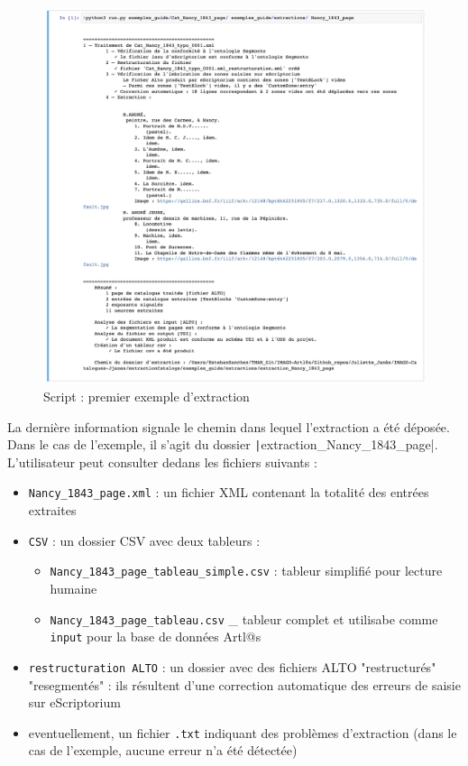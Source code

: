 \documentclass[a4paper,12pt,twoside]{book}
\begin{document}
\begin{figure}
	\centering
	\includegraphics[scale=0.5]{jupyter_commande.png}
	\caption{Script : premier exemple d'extraction}	
	\label{commandelancee}
\end{figure}

La dernière information signale le chemin dans lequel l'extraction a été déposée. Dans le cas de l'exemple, il s'agit du dossier  \texttt|extraction_Nancy_1843_page|. L'utilisateur peut consulter dedans les fichiers suivants :

\begin{itemize}
	\item \texttt{Nancy\_1843\_page.xml} : un fichier XML contenant la totalité des entrées extraites
	
	\item \texttt{CSV} : un dossier CSV avec deux tableurs :
	\begin{itemize}
		\item \texttt{Nancy\_1843\_page\_tableau\_simple.csv} : tableur simplifié pour lecture humaine
		\item \texttt{Nancy\_1843\_page\_tableau.csv} \_ tableur complet et utilisabe comme \texttt{input} pour la base de données Artl@s
	\end{itemize}

	\item \texttt{restructuration ALTO} : un dossier avec des fichiers ALTO "restructurés"  "resegmentés" : ils résultent d'une correction automatique des erreurs de saisie sur eScriptorium

	\item eventuellement, un fichier \texttt{.txt} indiquant des problèmes d'extraction (dans le cas de l'exemple, aucune erreur n'a été détectée)
\end{itemize}
\end{document}
